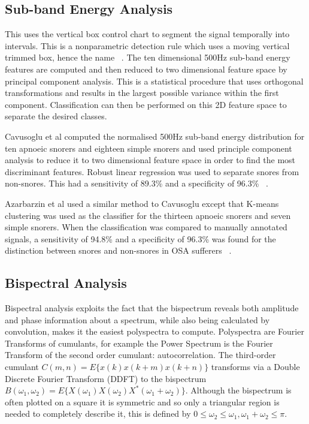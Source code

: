 \subsection{Sub-band Energy Analysis}
This uses the vertical box control chart to segment the signal temporally into intervals. This is a nonparametric detection rule which uses a moving vertical trimmed box, hence the name ~\cite{vbox}. The ten dimensional 500Hz sub-band energy features are computed and then reduced to two dimensional feature space by principal component analysis. This is a statistical procedure that uses orthogonal transformations and results in the largest possible variance within the first component. Classification can then be performed on this 2D feature space to separate the desired classes. 

Cavusoglu et al computed the normalised 500Hz sub-band energy distribution for ten apnoeic snorers and eighteen simple snorers and used principle component analysis to reduce it to two dimensional feature space in order to find the most discriminant features. Robust linear regression was used to separate snores from non-snores. This had a sensitivity of 89.3\% and a specificity of 96.3\% ~\cite{cavusoglu2007efficient}.

Azarbarzin et al used a similar method to Cavusoglu except that K-means clustering was used as the classifier for the thirteen apnoeic snorers and seven simple snorers. When the classification was compared to manually annotated signals, a sensitivity of 94.8\% and a specificity of 96.3\% was found for the distinction between snores and non-snores in OSA sufferers ~\cite{azarbarzin2010unsupervised}.
\subsection{Bispectral Analysis}
Bispectral analysis exploits the fact that the bispectrum reveals both amplitude and phase information about a spectrum, while also being calculated by convolution, makes it the easiest polyspectra to compute. Polyspectra are Fourier Transforms of cumulants, for example the Power Spectrum is the Fourier Transform of the second order cumulant: autocorrelation.  The third-order cumulant $C(m,n)=E\{x(k)x(k+m)x(k+n)\}$ transforms via a Double Discrete Fourier Transform (DDFT) to the bispectrum $B(\omega_1,\omega_2) = E\{X(\omega_1)X(\omega_2)X^*(\omega_1+\omega_2)\}$. Although the bispectrum is often plotted on a square it is symmetric and so only a triangular region is needed to completely describe it, this is defined by $ 0\leq \omega_2 \leq \omega_1, \omega_1 + \omega_2 \leq \pi $.


